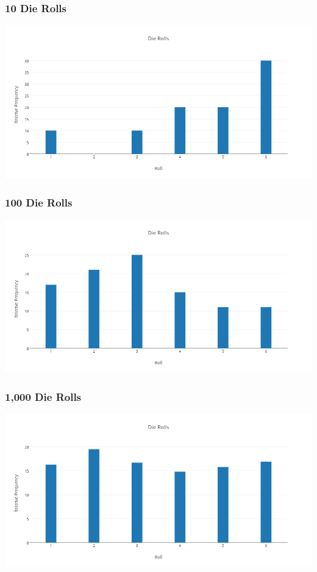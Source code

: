\documentclass{beamer}
\begin{document}
\begin{frame}
\frametitle{10 Die Rolls}
    \centering
    \includegraphics[scale = 0.3]{./images/die1.png}
\end{frame}

\begin{frame}
\frametitle{100 Die Rolls}
	\centering
	\includegraphics[scale = 0.3]{./images/die2.png}
\end{frame}

\begin{frame}
\frametitle{1,000 Die Rolls}
	\centering
	\includegraphics[scale = 0.3]{./images/die3.png}
\end{frame}
\end{document}
